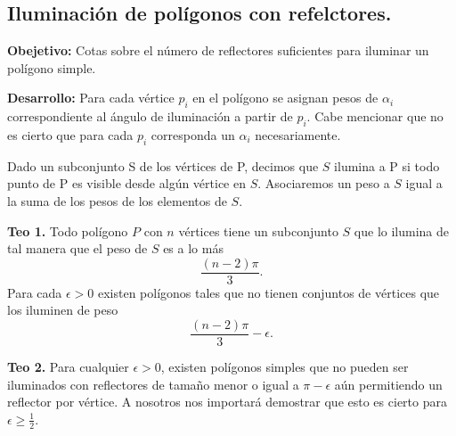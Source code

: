 \subsection[Expositor: Juan Manuel Díaz Quiñonez.]{Iluminación de polígonos con refelctores.}
\textbf{Obejetivo:} Cotas sobre el número de reflectores suficientes para iluminar un polígono simple.\newline

\textbf{Desarrollo:} Para cada vértice $p_i$ en el polígono se asignan pesos de $\alpha_i$ correspondiente
al ángulo de iluminación a partir de $p_i$. Cabe mencionar que no es cierto que para cada $p_i$ corresponda
un $\alpha_i$ necesariamente.\newline

Dado un subconjunto S de los vértices de P, decimos que $S$ ilumina a P si todo punto de P es visible desde algún
vértice en $S$. Asociaremos un peso a $S$ igual a la suma de los pesos de los elementos de $S$.

\begin{center}
  \textbf{Teo 1.} Todo polígono $P$ con $n$ vértices tiene un subconjunto $S$
  que lo ilumina de tal manera que el peso de $S$ es a lo más
  \[\frac{(n - 2)\pi}{3}.\]
  Para cada $\epsilon > 0$ existen polígonos tales que
  no tienen conjuntos de vértices que los iluminen de peso
  \[\frac{(n - 2)\pi}{3} - \epsilon.\]
\end{center}


\begin{center}
  \textbf{Teo 2.} Para cualquier $\epsilon > 0$, existen polígonos simples que no
  pueden ser iluminados con reflectores de tamaño menor o igual a $\pi - \epsilon$
  aún permitiendo un reflector por vértice. A nosotros nos importará demostrar que esto es cierto
  para $\epsilon \geq \frac{1}{2}$.
\end{center}

